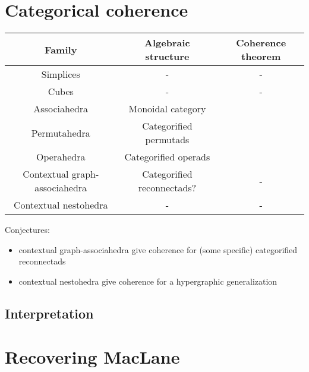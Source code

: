 
\section{Categorical coherence} 
\label{s:coherence}


\begin{table}[h!]
	\begin{center}
	\begin{tabular}{c|c|c}
	Family & Algebraic structure & Coherence theorem \\
	\hline
	Simplices & - & - \\
	Cubes & - & - \\
	Associahedra & Monoidal category & \cite{MacLane63} \\
	Permutahedra & Categorified permutads & \cite{CLA1} \\
	Operahedra & Categorified operads & \cite{DP15,CLA1} \\
	Contextual graph-associahedra & Categorified reconnectads? & - \\
	Contextual nestohedra & - & - 
	\end{tabular}
	\end{center}
\end{table}

Conjectures: 
\begin{itemize}
  \item contextual graph-associahedra give coherence for (some specific) categorified reconnectads \cite{DotsenkoKeilthyLyskov}
  \item contextual nestohedra give coherence for a hypergraphic generalization
\end{itemize}




\subsection{Interpretation}




\section{Recovering MacLane}

